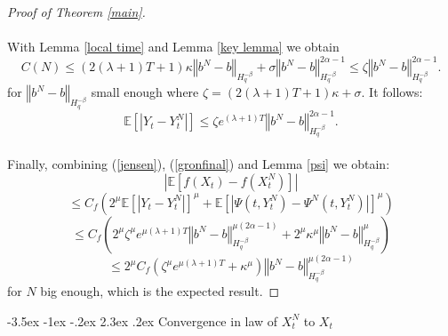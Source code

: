 \documentclass[11pt]{article}
\makeatletter
\renewcommand\section{\@startsection {section}{1}{\z@}%
    {-3.5ex \@plus -1ex \@minus -.2ex}%
    {2.3ex \@plus.2ex}%
    {\centering\large\scshape\bfseries}}
\newcommand{\norme}[1]{\left\Vert #1\right\Vert}
\newcommand{\E}{\mathbb{E}}
\makeatother
\begin{document}
\begin{proof}[Proof of Theorem \ref{main}]
    \paragraph{}
    With Lemma \ref{local time} and Lemma \ref{key lemma} we obtain \begin{equation*}
    C(N) \leq (2(\lambda + 1)T+1)\kappa\norme{b^N-b}_{H^{-\beta}_{q}}   + \sigma\norme{b^N-b}_{H^{-\beta}_{q}}^{2\alpha-1} \leq \zeta \norme{b^N-b}_{H^{-\beta}_{q}}^{2\alpha-1}.
    \end{equation*}   
    for $\norme{b^N-b}_{H^{-\beta}_{q}}$ small enough where $\zeta = (2(\lambda + 1)T+1)\kappa + \sigma $. It follows:
    \begin{equation}\label{gronfinal}
    \E\left[\left|Y_t-Y_t^N\right|\right] \leq \zeta e^{(\lambda + 1)T} \norme{b^N-b}_{H^{-\beta}_{q}}^{2\alpha-1}.
    \end{equation}
    
    \paragraph{}
    Finally, combining (\ref{jensen}), (\ref{gronfinal}) and Lemma \ref{psi} we obtain:    
    \begin{equation*}
    \left|\E\left[f\left(X_t\right)-f\left(X_t^N\right)\right]\right| 
    \end{equation*}
    \begin{equation*}
    \leq C_f  \left(2^\mu\E\left[\left|Y_t-Y_t^N\right|\right]^\mu+\E\left[\left|\Psi\left(t,Y_t^N\right)-\Psi^N\left(t,Y_t^N\right)\right|\right]^\mu\right)
    \end{equation*} 
    \begin{equation*}
    \leq C_f  \left(2^\mu\zeta^\mu e^{\mu(\lambda+1)T} \norme{b^N-b}_{H^{-\beta}_{q}}^{\mu(2\alpha-1)} + 2^\mu \kappa^\mu \norme{b^N-b}_{H^{-\beta}_q}^\mu\right)
    \end{equation*}
    \begin{equation}
    \leq 2^\mu C_f  \left(\zeta^\mu e^{\mu(\lambda+1)T} +  \kappa^\mu\right)\norme{b^N-b}_{H^{-\beta}_{q}}^{\mu(2\alpha-1)}
    \end{equation}       
    for $N$ big enough, which is the expected result.    
\end{proof}   


\section{Convergence in law of $X^N_t$ to $X_t$}
\end{document}
